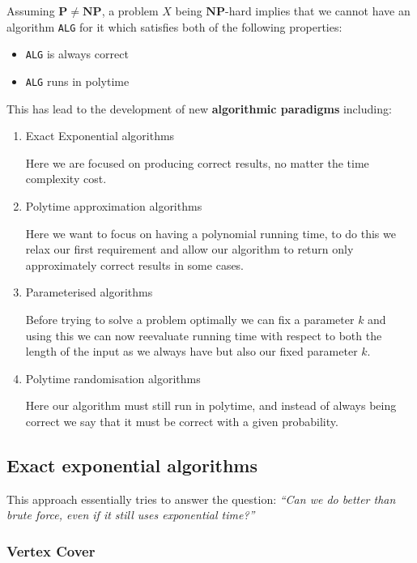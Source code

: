 \documentclass{article}
\newcommand{\NP}{\mathbf{NP}}
\renewcommand{\P}{\mathbf{P}}
\begin{document}
Assuming $\P \neq \NP$, a problem $X$ being $\NP$-hard implies that we cannot have an algorithm \texttt{ALG} for it which satisfies both of the following properties:

\begin{itemize}
  \item \texttt{ALG} is always correct
  \item \texttt{ALG} runs in polytime
\end{itemize}

This has lead to the development of new \textbf{algorithmic paradigms} including:
\begin{enumerate}
  \item Exact Exponential algorithms

        Here we are focused on producing correct results, no matter the time complexity cost.

  \item Polytime approximation algorithms

        Here we want to focus on having a polynomial running time, to do this we relax our first requirement and allow our algorithm to return only approximately correct results in some cases.

  \item Parameterised algorithms

        Before trying to solve a problem optimally we can fix a parameter $k$ and using this we can now reevaluate running time with respect to both the length of the input as we always have but also our fixed parameter $k$.

  \item Polytime randomisation algorithms

        Here our algorithm must still run in polytime, and instead of always being correct we say that it must be correct with a given probability.
\end{enumerate}


\subsection{Exact exponential algorithms}
\label{subsec:exact-exponential}

This approach essentially tries to answer the question: \textit{``Can we do better than brute force, even if it still uses exponential time?''}

\subsubsection{Vertex Cover}
\end{document}

